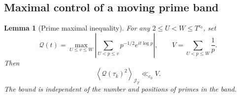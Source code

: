 \documentclass[11pt,reqno]{amsart}
\numberwithin{equation}{section}
\newtheorem{lemma}[theorem]{Lemma}
\newcommand{\avgJ}[1]{\left\langle #1\right\rangle_{\mathcal J_T}}
\begin{document}
\subsection{Maximal control of a moving prime band}
\begin{lemma}[Prime maximal inequality]\label{ov:lem:maximal}
For any $2\le U<W\le T^{c_0}$, set
\begin{equation}
\mathcal Q(t)=\max_{U\le v\le W}
\left|\sum_{U<p\le v}p^{-1/2}e^{it\log p}\right|,
\qquad V=\sum_{U<p\le W}\frac1p.
\end{equation}
Then
\begin{equation}
\avgJ{\mathcal Q(\tau_k)^2}\ll_{c_0}V.
\label{ov:eq:max}
\end{equation}
The bound is independent of the number and positions of primes in the band.
\end{lemma}
\end{document}
